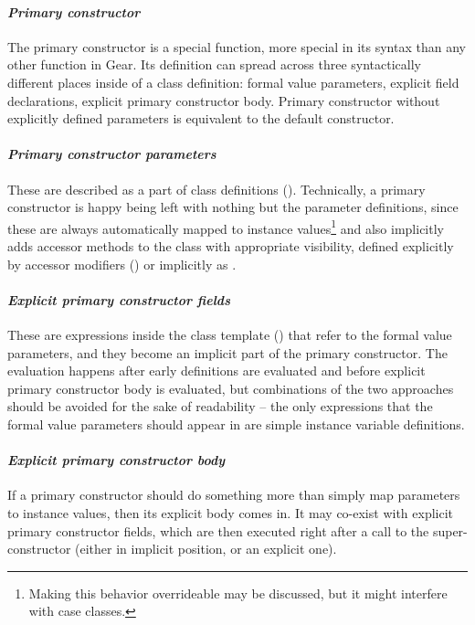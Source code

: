 \paragraph{\em Primary constructor}
The primary constructor is a special function, more special in its syntax than any other function in Gear. Its definition can spread across three syntactically different places inside of a class definition: formal value parameters, explicit field declarations, explicit primary constructor body. Primary constructor without explicitly defined parameters is equivalent to the default constructor. 

\paragraph{\em Primary constructor parameters}
These are described as a part of class definitions (). Technically, a primary constructor is happy being left with nothing but the parameter definitions, since these are always automatically mapped to instance values\footnote{Making this behavior overrideable may be discussed, but it might interfere with case classes.} and also implicitly adds accessor methods to the class with appropriate visibility, defined explicitly by accessor modifiers () or implicitly as . 

\paragraph{\em Explicit primary constructor fields}
These are expressions inside the class template () that refer to the formal value parameters, and they become an implicit part of the primary constructor. The evaluation happens after early definitions are evaluated and before explicit primary constructor body is evaluated, but combinations of the two approaches should be avoided for the sake of readability -- the only expressions that the formal value parameters should appear in are simple instance variable definitions. 

\paragraph{\em Explicit primary constructor body}
If a primary constructor should do something more than simply map parameters to instance values, then its explicit body comes in. It may co-exist with explicit primary constructor fields, which are then executed right after a call to the super-constructor (either in implicit position, or an explicit one). 


